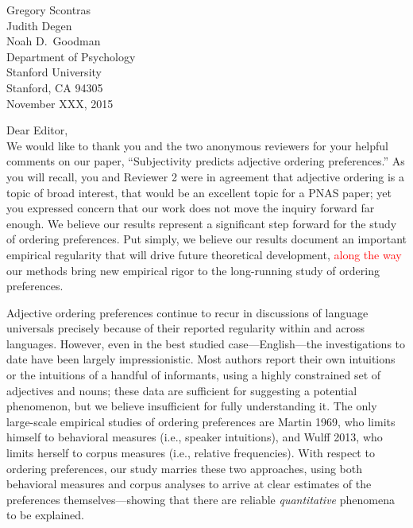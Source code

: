 \documentclass[12pt]{article}
\begin{document}
{\flushright

\vspace{25pt}
Gregory Scontras\\
Judith Degen\\
Noah D.~Goodman\\
Department of Psychology\\
Stanford University\\
Stanford, CA 94305\\[20pt]

\noindent November XXX, 2015\\[20pt]}


\noindent Dear Editor,\\

\noindent We would like to thank you and the two anonymous reviewers for your helpful comments on our paper, ``Subjectivity predicts adjective ordering preferences.'' As you will recall, you and Reviewer 2 were in agreement that adjective ordering is a topic of broad interest, that would be an excellent topic for a PNAS paper; yet you expressed concern that our work does not move the inquiry forward far enough. We believe our results represent a significant step forward for the study of ordering preferences. Put simply, we believe our results document an important empirical regularity that will drive future theoretical development, \textcolor{red}{along the way} our methods bring new empirical rigor to the long-running study of ordering preferences. 

Adjective ordering preferences continue to recur in discussions of language universals precisely because of their reported regularity within and across languages. However, even in the best studied case---English---the investigations to date have been largely impressionistic. Most authors report their own intuitions or the intuitions of a handful of informants, using a highly constrained set of adjectives and nouns; these data are sufficient for suggesting a potential phenomenon, but we believe insufficient for fully understanding it. The only large-scale empirical studies of ordering preferences are Martin 1969, who limits himself to behavioral measures (i.e., speaker intuitions), and Wulff 2013, who limits herself to corpus measures (i.e., relative frequencies). With respect to ordering preferences, our study marries these two approaches, using both behavioral measures and corpus analyses to arrive at clear estimates of the preferences themselves---showing that there are reliable \emph{quantitative} phenomena to be explained.
\end{document}
